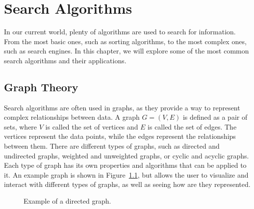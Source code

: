 \chapter{Search Algorithms}

In our current world, plenty of algorithms are used to search for information. From the most basic ones, such as sorting algorithms, to the most complex ones, such as search engines. In this chapter, we will explore some of the most common search algorithms and their applications.

\section{Graph Theory}

Search algorithms are often used in graphs, as they provide a way to represent complex relationships between data. A graph $G=(V,E)$ is defined as a pair of sets, where $V$ is called the set of vertices and $E$ is called the set of edges. The vertices represent the data points, while the edges represent the relationships between them. There are different types of graphs, such as directed and undirected graphs, weighted and unweighted graphs, or cyclic and acyclic graphs. Each type of graph has its own properties and algorithms that can be applied to it. An example graph is shown in Figure~\ref{fig:graph}, but  allows the user to visualize and interact with different types of graphs, as well as seeing how are they represented.
\begin{figure}
    \centering
    \caption{Example of a directed graph.}
    \label{fig:graph}
\end{figure}

